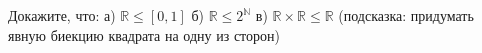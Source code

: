 
Докажите, что:
а) $\mathbb{R} \le [0, 1]$
б) $\mathbb{R} \le 2^{\mathbb{N}}$
в) $\mathbb{R} \times \mathbb{R} \le \mathbb{R}$ (подсказка: придумать явную биекцию
квадрата на одну из сторон)